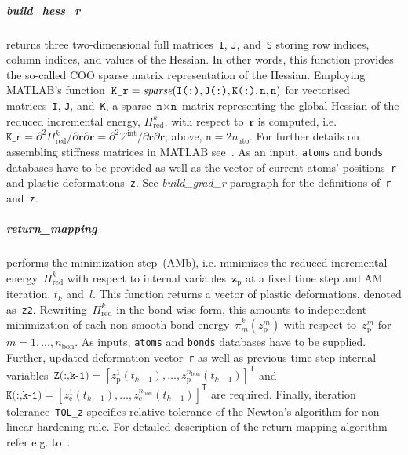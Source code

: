 \documentclass[preprint,12pt,authoryear]{elsarticle}
\newcommand{\bs}[1]{{\boldsymbol{#1}}}
\begin{document}
\subparagraph{build\_hess\_r} returns three two-dimensional full matrices~\texttt{I}, \texttt{J}, and~\texttt{S} storing row indices, column indices, and values of the Hessian. In other words, this function provides the so-called COO sparse matrix representation of the Hessian. Employing MATLAB's function~$\texttt{K\_r} = \allowbreak \emph{sparse}(\texttt{I(:)},\texttt{J(:)},\texttt{K(:)},\texttt{n},\texttt{n})$ for vectorised matrices~\texttt{I}, \texttt{J}, and~\texttt{K}, a sparse $\texttt{n}\times\texttt{n}$ matrix representing the global Hessian of the reduced incremental energy, $\Pi^k_\mathrm{red}$, with respect to~$\bs{r}$ is computed, i.e.~$\texttt{K\_r}=\partial^2\Pi^k_\mathrm{red}/\partial\bs{r}\partial\bs{r}=\partial^2\mathcal{V}^\mathrm{int}/\partial\bs{r}\partial\bs{r}$; above, $\texttt{n} = 2n_\mathrm{ato}$. For further details on assembling stiffness matrices in MATLAB see~\cite{Stiffness}. As an input, \texttt{atoms} and \texttt{bonds} databases have to be provided as well as the vector of current atoms' positions~\texttt{r} and plastic deformations~\texttt{z}. See \emph{build\_grad\_r} paragraph for the definitions of~\texttt{r} and~\texttt{z}.
%
%
\subparagraph{return\_mapping} performs the minimization step~(AMb), i.e. minimizes the reduced incremental energy~$\Pi^k_\mathrm{red}$ with respect to internal variables~$\bs{z}_\mathrm{p}$ at a fixed time step and AM iteration, $t_k$ and~$l$. This function returns a vector of plastic deformations, denoted as~\texttt{z2}. Rewriting~$\Pi^k_\mathrm{red}$ in the bond-wise form, this amounts to independent minimization of each non-smooth bond-energy~$\widetilde{\pi}_m^k(z_\mathrm{p}^m)$ with respect to~$z_\mathrm{p}^m$ for~$m=1,\dots,n_\mathrm{bon}$. As inputs, \texttt{atoms} and \texttt{bonds} databases have to be supplied. Further, updated deformation vector~\texttt{r} as well as previous-time-step internal variables~$\texttt{Z(:,k-1)}=[z_\mathrm{p}^1(t_{k-1}),\allowbreak\dots,\allowbreak z_\mathrm{p}^{n_\mathrm{bon}}(t_{k-1})]^\mathsf{T}$ and~$\texttt{K(:,k-1)}=[z_\mathrm{c}^1(t_{k-1}),\allowbreak\dots,\allowbreak z_\mathrm{c}^{n_\mathrm{bon}}(t_{k-1})]^\mathsf{T}$ are required. Finally, iteration tolerance~\texttt{TOL\_z} specifies relative tolerance of the Newton's algorithm for non-linear hardening rule. For detailed description of the return-mapping algorithm refer e.g. to~\cite[Section~1.4.2]{SimoInelast}.
\end{document}
